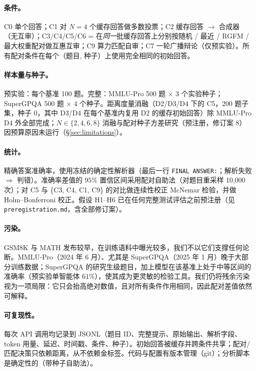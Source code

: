 \documentclass[UTF8,11pt]{ctexart}
\begin{document}
\paragraph{条件。} C0 单个回答；C1 对 $N{=}4$ 个缓存回答做多数投票；C2 缓存回答 $\rightarrow$ 合成器（无互审）；C3/C4/C5/C6 = 在\emph{同一}批缓存回答上分别按随机 / 最近 / RGFM / 最大权重配对做互惠互审；C9 算力匹配自审；C7 一轮广播辩论（仅预实验）。所有配对条件在每个（题目, 种子）上使用完全相同的初始回答。

\paragraph{样本量与种子。} 预实验：每个基准 100 题。完整：MMLU-Pro 500 题 $\times$ 3 个实验种子；SuperGPQA 500 题 $\times$ 4 个种子。距离度量消融（D2/D3/D4 下的 C5，200 题子集，种子 0，其中 D3/D4 在每个基准内复用 D2 的缓存初始回答）除 MMLU-Pro D4 外全部完成；$N \in \{2,4,6,8\}$ 消融与配对种子方差研究（预注册，修订案 8）因预算原因未运行（\S\ref{sec:limitations}）。

\paragraph{统计。} 精确答案准确率，使用冻结的确定性解析器（最后一行 \texttt{FINAL ANSWER:}；解析失败 $\Rightarrow$ 判错）。准确率差值的 $95\%$ 置信区间采用配对自助法（对题目重采样 10{,}000 次）；对 C5 与 \{C3, C4, C1, C9\} 的对比做连续性校正 McNemar 检验，并做 Holm--Bonferroni 校正。假设 H1--H6 已在任何完整测试评估之前预注册（见 \texttt{preregistration.md}，含全部修订案）。

\paragraph{污染。} GSM8K 与 MATH 发布较早，在训练语料中曝光较多，我们不以它们支撑任何论断。MMLU-Pro（2024 年 6 月）、尤其是 SuperGPQA（2025 年 1 月）晚于大部分训练数据；SuperGPQA 的研究生级题目，加上模型在该基准上处于中等区间的准确率（预实验单智能体 $61\%$），使其成为更灵敏的检验工具。我们仍将残余污染视为一项局限：它只会抬高绝对数值，且对所有条件作用相同，因此配对差值依然可解释。

\paragraph{可复现性。} 每次 API 调用均记录到 JSONL（题目 ID、完整提示、原始输出、解析字段、token 用量、延迟、时间戳、条件、种子）。初始回答被缓存并跨条件共享；配对/匹配决策只依赖距离，从不依赖金标签。代码与配置有版本管理（git）；分析脚本是确定性的（带种子自助法）。
\end{document}
